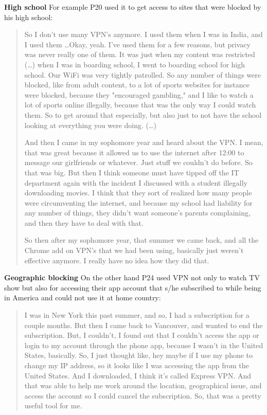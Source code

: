 \textbf{High school} For example P20 used it to get access to sites that were
blocked by his high school: 
\begin{quote}So I don't use many VPN's anymore. I used them when I was in
    India, and I used them \dots Okay, yeah. I've used them for a few reasons,
    but privacy was never really one of them. It was just when my content was
    restricted (\dots) when I was in boarding school, I went to boarding
    school for high school. Our WiFi was very tightly patrolled. So any number
    of things were blocked, like from adult content, to a lot of sports
    websites for instance were blocked, because they "encouraged gambling,"
    and I like to watch a lot of sports online illegally, because that was the
    only way I could watch them. So to get around that especially, but also
    just to not have the school looking at everything you were doing. (\dots) 

And then I came in my sophomore year and heard about the VPN. I mean, that was
    great because it allowed us to use the internet after 12:00 to message our
    girlfriends or whatever. Just stuff we couldn't do before. So that was
    big. But then I think someone must have tipped off the IT department again
    with the incident I discussed with a student illegally downloading movies.
    I think that they sort of realized how many people were circumventing the
    internet, and because my school had liability for any number of things,
    they didn't want someone's parents complaining, and then they have to deal
    with that.


So then after my sophomore year, that summer we came back, and all the Chrome
add on VPN's that we had been using, basically just weren't effective anymore.
I really have no idea how they did that.\end{quote}


\textbf{Geographic blocking} On the other hand P24 used VPN not only to watch
TV show but also for accessing their app account that s/he subscribed to while
being in America and could not use it at home country: \begin{quote}I was in
New York this past summer, and so, I had a subscription for a couple months.
But then I came back to Vancouver, and wanted to end the subscription. But, I
couldn't, I found out that I couldn't access the app or login to my account
through the phone app, because I wasn't in the United States, basically. So, I
just thought like, hey maybe if I use my phone to change my IP address, so it
looks like I was accessing the app from the United States. And I downloaded, I
think it's called Express VPN. And that was able to help me work around the
location, geographical issue, and access the account so I could cancel the
subscription. So, that was a pretty useful tool for me.\end{quote}


